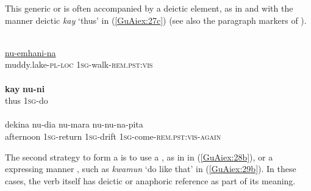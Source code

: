 \documentclass[output=paper]{LSP/langsci}
\begin{document}
This generic or  is often accompanied by a deictic element, as in  \citep[][295]{vangijn14} and  with the manner deictic \textit{kay} `thus' in (\ref{GuAiex:27c}) (see also the paragraph markers of \citealt[][701]{Loos1963}).

\begin{exe}
\ex \label{GuAiex:27ad}
\begin{xlist}
\ex \label{GuAiex:27a}
\glt {}\\ \vspace{-0.2in}
\ex \label{GuAiex:27b}
\gll  \underline{}     \underline{nu-emhani-na}\\
 muddy.lake-\textsc{pl-loc}  \textsc{1sg}-walk-\textsc{rem.pst:vis}\\
\glt {}\\
\ex \label{GuAiex:27c}
\gll  \textbf{kay}   \textbf{nu-ni}\\
 thus   \textsc{1sg}-do\\
\glt {}\\
\ex \label{GuAiex:27d}
\gll  dekina     nu-dia     nu-mara   nu-nu-na-pita\\
 afternoon   \textsc{1sg}-return   \textsc{1sg}-drift   \textsc{1sg}-come-\textsc{rem.pst:vis-again}\\
\glt {}
\end{xlist}
\end{exe}



The second strategy to form a  is to use a , as in  in (\ref{GuAiex:28b}), or a  expressing manner \citep[see][]{guerin15}, such as \textit{kwamun} `do like that' in (\ref{GuAiex:29b}). In these cases, the verb itself has deictic or anaphoric reference as part of its meaning.
\end{document}
